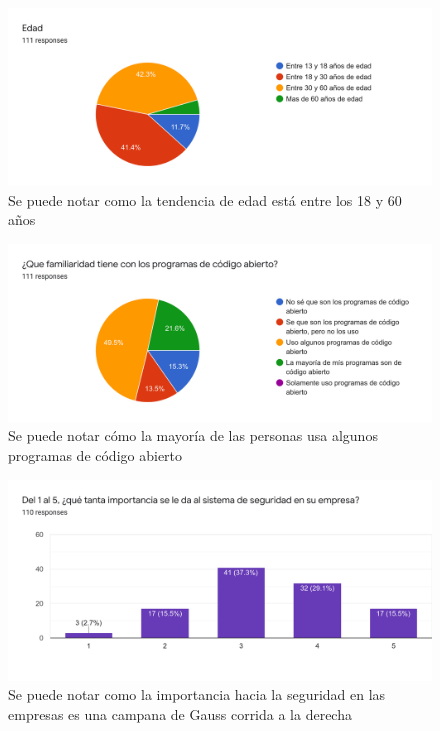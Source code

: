 \documentclass{article}
\begin{document}
\begin{figure}[H]
	\includegraphics[width=\textwidth]{1.png}
	\centering
	\caption{Se puede notar como la tendencia de edad está entre los 18 y 60 años}
\end{figure}
\begin{figure}[H]
	\includegraphics[width=\textwidth]{2.png}
	\centering
	\caption{Se puede notar cómo la mayoría de las personas usa algunos programas de código abierto}
\end{figure}
\begin{figure}[H]
	\includegraphics[width=\textwidth]{3.png}
	\centering
	\caption{Se puede notar como la importancia hacia la seguridad en las empresas es una campana de Gauss corrida a la derecha}
\end{figure}
\end{document}
